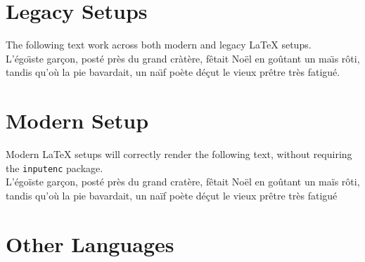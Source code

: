 \documentclass{article}
\begin{document}
\section{Legacy Setups}
The following text work across both modern and legacy \LaTeX{} setups.\\[10pt]
L'\'ego\"\i ste gar\c{c}on, post\'e pr\`es du grand cr\`at\`ere, f\^etait No\"el en go\^utant un ma\"\i s r\^oti, 
tandis qu'o\`u la pie bavardait, un na\"\i f po\`ete d\'e\c{c}ut le vieux pr\^etre tr\`es fatigu\'e.

\section{Modern Setup}
Modern \LaTeX{} setups will correctly render the following text, without requiring the \texttt{inputenc} package.\\[10pt]
L'égoïste garçon, posté près du grand cratère, fêtait Noël en goûtant un maïs rôti, tandis qu'où la pie bavardait, un naïf poète déçut le vieux prêtre très fatigué


\section{Other Languages}
\end{document}
